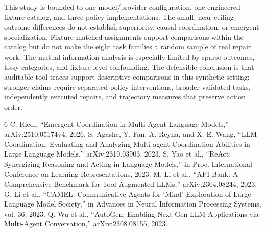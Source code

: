 \documentclass[conference]{IEEEtran}
\begin{document}
This study is bounded to one model/provider configuration, one engineered fixture catalog, and three policy implementations. The small, near-ceiling outcome differences do not establish superiority, causal coordination, or emergent specialization. Fixture-matched assignments support comparisons within the catalog but do not make the eight task families a random sample of real repair work. The mutual-information analysis is especially limited by sparse outcomes, lossy categories, and fixture-level confounding. The defensible conclusion is that auditable tool traces support descriptive comparisons in this synthetic setting; stronger claims require separated policy interventions, broader validated tasks, independently executed repairs, and trajectory measures that preserve action order.

\begin{thebibliography}{6}
 C. Riedl, ``Emergent Coordination in Multi-Agent Language Models,'' arXiv:2510.05174v4, 2026.
 S. Agashe, Y. Fan, A. Reyna, and X. E. Wang, ``LLM-Coordination: Evaluating and Analyzing Multi-agent Coordination Abilities in Large Language Models,'' arXiv:2310.03903, 2023.
 S. Yao et al., ``ReAct: Synergizing Reasoning and Acting in Language Models,'' in Proc. International Conference on Learning Representations, 2023.
 M. Li et al., ``API-Bank: A Comprehensive Benchmark for Tool-Augmented LLMs,'' arXiv:2304.08244, 2023.
 G. Li et al., ``CAMEL: Communicative Agents for `Mind' Exploration of Large Language Model Society,'' in Advances in Neural Information Processing Systems, vol. 36, 2023.
 Q. Wu et al., ``AutoGen: Enabling Next-Gen LLM Applications via Multi-Agent Conversation,'' arXiv:2308.08155, 2023.
\end{thebibliography}
\end{document}
